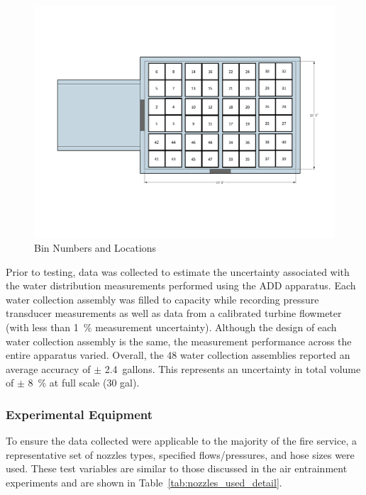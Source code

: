 \documentclass{article}
\begin{document}
\begin{figure}[!ht]
	\centering
	\includegraphics[width=\columnwidth]{Figures/Water_Distribution/Bin_Numbers_NoDimensions}
	\caption{Bin Numbers and Locations}
	\label{fig:Bin Numbers and Locations}
\end{figure}

Prior to testing, data was collected to estimate the uncertainty associated with the water distribution measurements performed using the ADD apparatus. Each water collection assembly was filled to capacity while recording pressure transducer measurements as well as data from a calibrated turbine flowmeter (with less than 1~\% measurement uncertainty). Although the design of each water collection assembly is the same, the measurement performance across the entire apparatus varied. Overall, the 48 water collection assemblies reported an average accuracy of $\pm$ 2.4~gallons. This represents an uncertainty in total volume of $\pm$ 8~\% at full scale (30 gal).

\subsubsection{Experimental Equipment}

To ensure the data collected were applicable to the majority of the fire service, a representative set of nozzles types, specified flows/pressures, and hose sizes were used. These test variables are similar to those discussed in the air entrainment experiments and are shown in Table~\ref{tab:nozzles_used_detail}.
\end{document}
